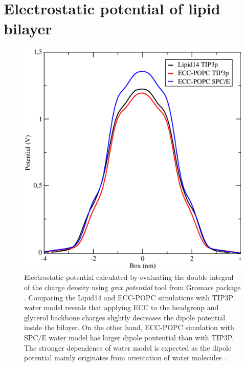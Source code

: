 \documentclass[journal=jpcbfk]{achemso}
\begin{document}
\section{Electrostatic potential of lipid bilayer}
\begin{figure}[!h]
  \centering
  \includegraphics[width=16.0cm]{../Fig/potential.eps}
  \caption{\label{potential}
    Electrostatic potential calculated by evaluating the double integral of the charge density
    using {\it gmx potential} tool from Gromacs package \cite{gromacsMANUAL}.
    Comparing the Lipid14 and ECC-POPC simulations with TIP3P water model
    reveals that applying ECC to the headgroup and glycerol backbone charges slightly decreases
    the dipole potential inside the bilayer. On the other hand, ECC-POPC simulation
    with SPC/E water model has larger dipole pontential than with TIP3P.
    The stronger dependence of water model is expected as the dipole potential
    mainly originates from orientation of water molecules \cite{gawrisch92}.
  }
\end{figure}

\newpage
\end{document}
